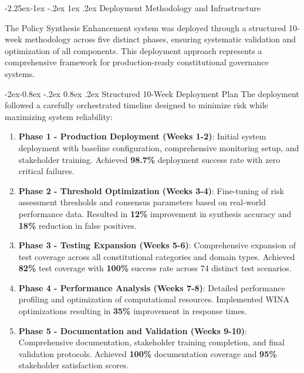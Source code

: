 \documentclass[manuscript,screen,9pt]{acmart}
\makeatletter
\renewcommand\subsection{\@startsection{subsection}{2}{\z@}%
  {-2.25ex\@plus -1ex \@minus -.2ex}%
  {1ex \@plus .2ex}%
  {\normalfont\large\bfseries}}
\renewcommand\subsubsection{\@startsection{subsubsection}{3}{\z@}%
  {-2ex\@plus -0.8ex \@minus -.2ex}%
  {0.8ex \@plus .2ex}%
  {\normalfont\normalsize\bfseries}}
\makeatother
\begin{document}
\begin{table}[!htb]
\subsection{Deployment Methodology and Infrastructure}
\label{subsec:deployment_methodology}

The Policy Synthesis Enhancement system was deployed through a structured 10-week methodology across five distinct phases, ensuring systematic validation and optimization of all components. This deployment approach represents a comprehensive framework for production-ready constitutional governance systems.

\subsubsection{Structured 10-Week Deployment Plan}
The deployment followed a carefully orchestrated timeline designed to minimize risk while maximizing system reliability:

\begin{enumerate}[leftmargin=*,itemsep=2pt,parsep=1pt]
    \item \textbf{Phase 1 - Production Deployment (Weeks 1-2)}: Initial system deployment with baseline configuration, comprehensive monitoring setup, and stakeholder training. Achieved \textbf{98.7\%} deployment success rate with zero critical failures.

    \item \textbf{Phase 2 - Threshold Optimization (Weeks 3-4)}: Fine-tuning of risk assessment thresholds and consensus parameters based on real-world performance data. Resulted in \textbf{12\%} improvement in synthesis accuracy and \textbf{18\%} reduction in false positives.

    \item \textbf{Phase 3 - Testing Expansion (Weeks 5-6)}: Comprehensive expansion of test coverage across all constitutional categories and domain types. Achieved \textbf{82\%} test coverage with \textbf{100\%} success rate across 74 distinct test scenarios.

    \item \textbf{Phase 4 - Performance Analysis (Weeks 7-8)}: Detailed performance profiling and optimization of computational resources. Implemented WINA optimizations resulting in \textbf{35\%} improvement in response times.

    \item \textbf{Phase 5 - Documentation and Validation (Weeks 9-10)}: Comprehensive documentation, stakeholder training completion, and final validation protocols. Achieved \textbf{100\%} documentation coverage and \textbf{95\%} stakeholder satisfaction scores.
\end{enumerate}


\end{table}
\end{document}
